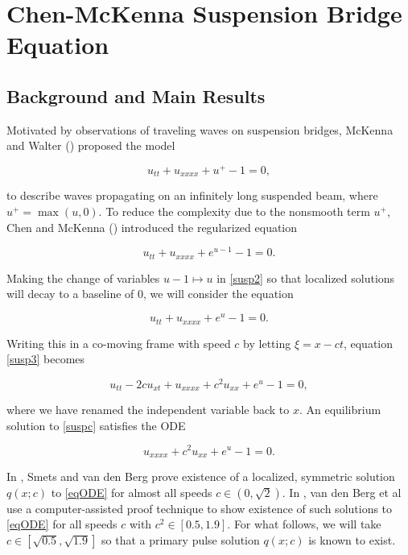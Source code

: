 \documentclass[12pt]{article}
\begin{document}
\section{Chen-McKenna Suspension Bridge Equation}

\subsection{Background and Main Results}\label{sec:mainresults}

Motivated by observations of traveling waves on suspension bridges, McKenna and Walter (\cite{McKenna1990}) proposed the model

\begin{equation}\label{susp}
u_{tt} + u_{xxxx} + u^+ - 1 = 0,
\end{equation}

to describe waves propagating on an infinitely long suspended beam, where $u^+ = \max(u, 0)$. To reduce the complexity due to the nonsmooth term $u^+$, Chen and McKenna (\cite{Chen1997}) introduced the regularized equation 

\begin{equation}\label{susp2}
u_{tt} + u_{xxxx} + e^{u-1} - 1 = 0.
\end{equation}

Making the change of variables $u - 1 \mapsto u$ in \eqref{susp2} so that localized solutions will decay to a baseline of 0, we will consider the equation

\begin{equation}\label{susp3}
u_{tt} + u_{xxxx} + e^{u} - 1 = 0.
\end{equation}

Writing this in a co-moving frame with speed $c$ by letting $\xi = x - ct$, equation \eqref{susp3} becomes

\begin{equation}\label{suspc}
u_{tt} - 2 c u_{x t} + u_{xxxx} + c^2 u_{xx} + e^{u} - 1 = 0,
\end{equation}

where we have renamed the independent variable back to $x$. An equilibrium solution to \eqref{suspc} satisfies the ODE

\begin{equation}\label{eqODE}
u_{xxxx} + c^2 u_{xx} + e^{u} - 1 = 0.
\end{equation}

In \cite[Theorem 11]{Smets2002}, Smets and van den Berg prove existence of a localized, symmetric solution $q(x; c)$ to \eqref{eqODE} for almost all speeds $c \in (0, \sqrt{2})$. In \cite[Theorem 1]{Berg2018}, van den Berg et al use a computer-assisted proof technique to show existence of such solutions to \eqref{eqODE} for all speeds $c$ with $c^2 \in [0.5, 1.9]$. For what follows, we will take $c \in [\sqrt{0.5}, \sqrt{1.9}]$ so that a primary pulse solution $q(x; c)$ is known to exist. \\
\end{document}
